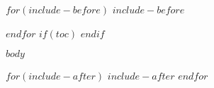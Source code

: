 \documentclass[10pt,openright]{$documentclass$}
\date{$date$}
\newcommand\blankpage{%
    \null
    \thispagestyle{empty}%
    \addtocounter{page}{-1}%
    \newpage}
\begin{document}






\newpage


$for(include-before)$
$include-before$

$endfor$
$if(toc)$
{
\setcounter{tocdepth}{$toc-depth$}
\tableofcontents
}
$endif$

\newpage
\clearpage


$body$


$for(include-after)$
$include-after$
$endfor$


\afterpage{\blankpage}
\clearpage
\newpage



\end{document}
